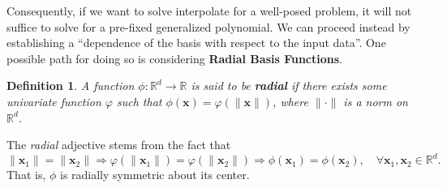 \documentclass[12pt]{report} %
\newtheorem{definition}{Definition}
\newcommand{\tmmathbf}[1]{\ensuremath{\boldsymbol{#1}}}
\newcommand{\tmem}[1]{{\em #1\/}}
\newcommand{\tmstrong}[1]{\textbf{#1}}
\begin{document}
Consequently, if we want to solve interpolate for a well-posed problem, it will not suffice to solve for a pre-fixed generalized polynomial. We can proceed instead by establishing a ``dependence of the basis with respect to the input data''. One possible path for doing so is considering \textbf{Radial Basis Functions}.

\begin{definition}\label{radialfunctions}
  A function $\phi : \mathbb{R}^d \rightarrow \mathbb{R}$ is said to be
  {\tmstrong{radial}} if there exists some univariate function $\varphi$ such
  that $\phi (\tmmathbf{x}) = \varphi (\| \tmmathbf{x} \|)$, where $\| \cdot
  \|$ is a norm on $\mathbb{R}^d$.
\end{definition}

The {\tmem{radial}} adjective stems from the fact that
\[ \| \tmmathbf{x}_1 \| = \| \tmmathbf{x}_2 \| \Rightarrow \varphi (\|
   \tmmathbf{x}_1 \|) = \varphi (\| \tmmathbf{x}_2 \|) \Rightarrow \phi
   (\tmmathbf{x}_1) = \phi (\tmmathbf{x}_2), \quad \forall \tmmathbf{x}_1,
   \tmmathbf{x}_2 \in \mathbb{R}^d . \]
That is, $\phi$ is radially symmetric about its center.
\end{document}
